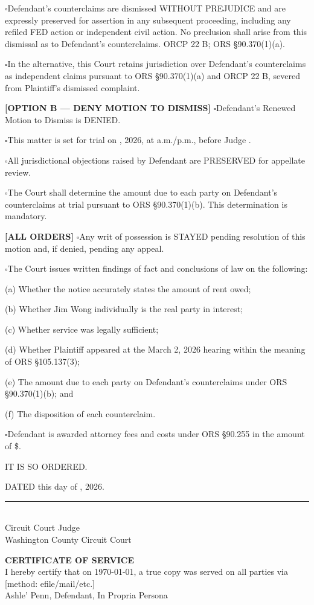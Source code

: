 \documentclass[12pt,letterpaper]{article}
\newcommand{\certificateofservice}[1]{%
	\vspace{0.5in}
	\noindent \textbf{CERTIFICATE OF SERVICE} \\
	I hereby certify that on \today, a true copy was served on all parties via [method: efile/mail/etc.] \\
	\vspace{0.5in}
	#1 \\
}
\begin{document}
\ensuremath{\square}Defendant's counterclaims are dismissed WITHOUT PREJUDICE and are expressly preserved for assertion in any subsequent proceeding, including any refiled FED action or independent civil action. No preclusion shall arise from this dismissal as to Defendant's counterclaims. ORCP 22 B; ORS \S90.370(1)(a).
	
	\ensuremath{\square}In the alternative, this Court retains jurisdiction over Defendant's counterclaims as independent claims pursuant to ORS \S90.370(1)(a) and ORCP 22 B, severed from Plaintiff's dismissed complaint.
	
	\textbf{[OPTION B --- DENY MOTION TO DISMISS]} \ensuremath{\square}Defendant's Renewed Motion to Dismiss is DENIED.
	
\ensuremath{\square}This matter is set for trial on \underline{\hspace{2in}}, 2026, at \underline{\hspace{0.75in}} a.m./p.m., before Judge \underline{\hspace{2in}}.
	
	\ensuremath{\square}All jurisdictional objections raised by Defendant are PRESERVED for appellate review.
	
	\ensuremath{\square}The Court shall determine the amount due to each party on Defendant's counterclaims at trial pursuant to ORS \S90.370(1)(b). This determination is mandatory.
	
	\textbf{[ALL ORDERS]} \ensuremath{\square}Any writ of possession is STAYED pending resolution of this motion and, if denied, pending any appeal.
	
	\ensuremath{\square}The Court issues written findings of fact and conclusions of law on the following:
	
	(a) Whether the notice accurately states the amount of rent owed;
	
	(b) Whether Jim Wong individually is the real party in interest;
	
	(c) Whether service was legally sufficient;
	
	(d) Whether Plaintiff appeared at the March 2, 2026 hearing within the meaning of ORS \S105.137(3);
	
	(e) The amount due to each party on Defendant's counterclaims under ORS \S90.370(1)(b); and
	
	(f) The disposition of each counterclaim.
	
\ensuremath{\square}Defendant is awarded attorney fees and costs under ORS \S90.255 in the amount of \$\underline{\hspace{1.5in}}.
	
	IT IS SO ORDERED.
	
	DATED this \underline{\hspace{1.5in}} day of \underline{\hspace{2in}}, 2026.
	
	\vspace{0.75in}
	
	\noindent\rule{3in}{0.5pt} \\
	Circuit Court Judge \\
	Washington County Circuit Court
	
	\certificateofservice{Ashle' Penn, Defendant, In Propria Persona}
	
\end{document}
